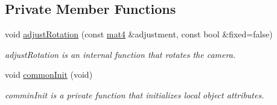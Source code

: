 \subsection*{Private Member Functions}
\begin{DoxyCompactItemize}
\item 
void \hyperlink{class_camera_aba32f195cdb5bfcfd05c2ce74315b6c3}{adjust\-Rotation} (const \hyperlink{class_angel_1_1mat4}{mat4} \&adjustment, const bool \&fixed=false)
\begin{DoxyCompactList}\small\item\em adjust\-Rotation is an internal function that rotates the camera. \end{DoxyCompactList}\item 
void \hyperlink{class_camera_a20243a7e3eb06ab1265118c5fb9cce9b}{common\-Init} (void)
\begin{DoxyCompactList}\small\item\em commin\-Init is a private function that initializes local object attributes. \end{DoxyCompactList}\end{DoxyCompactItemize}
